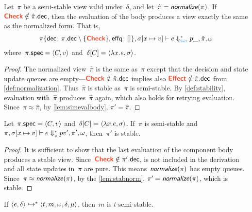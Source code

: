 \begin{lem}\label{lem:stabnorm}
  Let~$\pi$ be a semi-stable view valid under~$\delta$, and let~$\hat\pi = \textsf{\textit{normalize}}(\pi)$.
  If $\dec{Check} \notin \hat\pi.\field{dec}$, then the evaluation of the body produces a view exactly the same as the normalized form.
  That is, \[\Step*<\phase{Succ}>[\pi\{\fv{dec}{\pi.\field{dec} \setminus \{\dec{Check}\}},\fv{effq}{[]}\}, \sigma[x\mapsto v]]{e}{\_,\hat\pi, \omega}\] where~$\pi.\textup{\textsf{spec}} = \langle C,v\rangle$ and~$\delta[C] = \langle\lambda x.\mskip 1mue, \sigma\rangle$.
\end{lem}

\begin{proof}
  The normalized view~$\hat\pi$ is the same as~$\pi$ except that the decision and state update queues are empty---$\dec{Check} \notin \hat\pi.\field{dec}$ implies also $\dec{Effect} \notin \hat\pi.\field{dec}$ from \cref{def:normalization}.
  Thus~$\hat\pi$ is stable as~$\pi$ is semi-stable.
  By \cref{def:stability}, evaluation with~$\hat\pi$ produces~$\hat\pi$ again, which also holds for retrying evaluation.
  Since~$\pi \approx \hat\pi$, by \cref{lem:simevalbody}, $\pi' = \hat\pi$.
\end{proof}


\begin{lem}\label{lem:stab}
  Let~$\pi.\textup{\textsf{spec}} = \langle C,v\rangle$ and~$\delta[C] = \langle\lambda x.e,\sigma\rangle$.
  If~$\pi$ is semi-stable and $\Step*[\pi,\sigma[x\mapsto v]]{e}{v',\pi', \omega}$,
  then~$\pi'$ is stable.
\end{lem}

\begin{proof}
  It is sufficient to show that the last evaluation of the component body produces a stable view.
  Since~$\dec{Check} \notin \pi'.\field{dec}$,  is not included in the derivation and all state updates in~$\pi$ are pure.
  This means~$\textsf{\textit{normalize}}(\pi)$ has empty queues.
  Since~$\pi \approx \textsf{\textit{normalize}}(\pi)$, by the \cref{lem:stabnorm}, $\pi' = \textsf{\textit{normalize}}(\pi)$,
  which is stable.
\end{proof}

\begin{lem}\label{lem:semistab}
  If $\langle e,\delta\rangle \hookrightarrow^* \langle t,m,\omega,\delta,\mu\rangle$, then~$m$ is $t$-semi-stable.
\end{lem}

